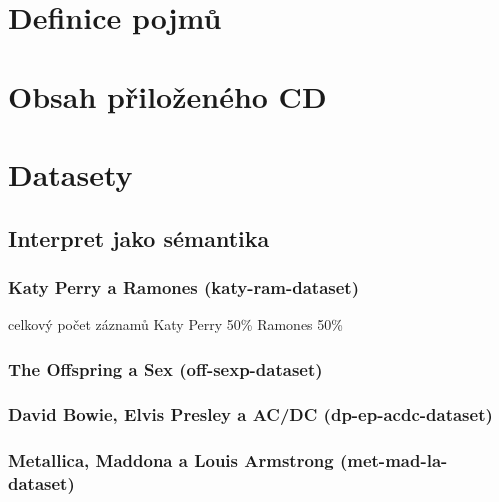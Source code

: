 \documentclass[thesis=M,czech]{FITthesis}[2012/06/26]
\begin{document}
\chapter{Definice pojmů}


\chapter{Obsah přiloženého CD}


\begin{figure}
\end{figure}

\chapter{Datasety}\label{app:datasets}

\section{Interpret jako sémantika}

\subsection{Katy Perry a Ramones (katy-ram-dataset)}\label{sec:katy-ram-dataset}

celkový počet záznamů
Katy Perry 50\%
Ramones 50\%

\subsection{The Offspring a Sex (off-sexp-dataset)}\label{sec:off-sexp-dataset}

\subsection{David Bowie, Elvis Presley a AC/DC (dp-ep-acdc-dataset)}\label{sec:dp-ep-acdc-dataset}

\subsection{Metallica, Maddona a Louis Armstrong (met-mad-la-dataset)}\label{sec:met-mad-la-dataset}
\end{document}
